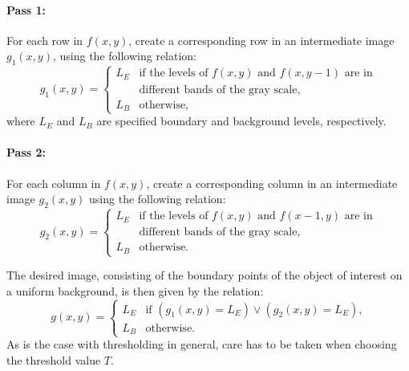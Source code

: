 \paragraph{Pass 1:} For each row in $f(x,y)$, create a corresponding
row in an intermediate image $g_{1}(x,y)$, using the following
relation: 
\begin{equation}
  g_{1}(x,y)=\left\{
    \begin{array}{ll}
      L_{E} & \mbox{if the levels of $f(x,y)$ and $f(x,y-1)$ are in} \\
            & \mbox{different bands of the gray scale,} \\
      L_{B} & \mbox{otherwise,}
    \end{array}\right.
\end{equation}
where $L_{E}$ and $L_{B}$ are specified boundary and background
levels, respectively.

\paragraph{Pass 2:} For each column in $f(x,y)$, create a
corresponding column in an intermediate image $g_{2}(x,y)$ using the
following relation:
\begin{equation}
  g_{2}(x,y)=\left\{
    \begin{array}{ll}
      L_{E} & \mbox{if the levels of $f(x,y)$ and $f(x-1,y)$ are in} \\
            & \mbox{different bands of the gray scale,} \\
      L_{B} & \mbox{otherwise.}
    \end{array}\right.
\end{equation}
\vspace*{0.1cm}

\noindent The desired image, consisting of the boundary points of the
object of interest on a uniform background, is then given by the
relation:
\begin{equation}
  g(x,y)=\left\{
    \begin{array}{ll}
      L_{E} & \mbox{if $(g_{1}(x,y)=L_{E})\vee (g_{2}(x,y)=L_{E})$,} \\
      L_{B} & \mbox{otherwise.}
    \end{array}\right.
\end{equation}
As is the case with thresholding in general, care has to be taken when
choosing the threshold value $T$.  

